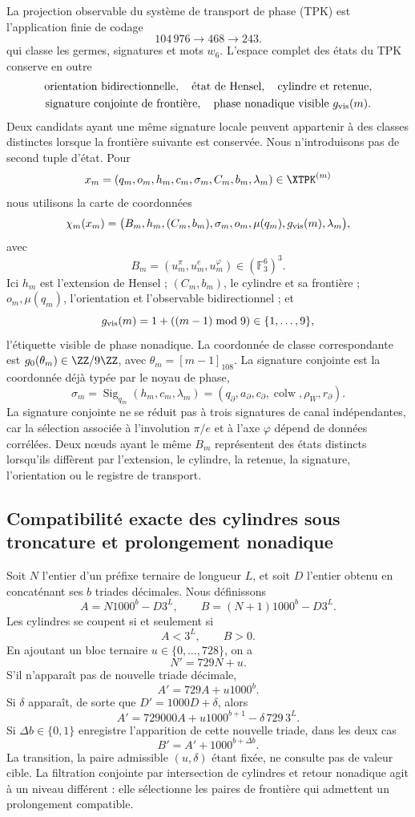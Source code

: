 La projection observable du système de transport de phase (TPK) est
l'application finie de codage
\[
104\,976\longrightarrow468\longrightarrow243.
\]
qui classe les germes, signatures et mots \(w_6\). L'espace complet des
états du TPK conserve en outre
\[
\begin{gathered}
\text{orientation bidirectionnelle},\quad
\text{état de Hensel},\quad
\text{cylindre et retenue},\\
\text{signature conjointe de frontière},\quad
\text{phase nonadique visible }g_{\rm vis}(m).
\end{gathered}
\]
Deux candidats ayant une même signature locale peuvent appartenir à des classes distinctes
lorsque la frontière suivante est conservée. Nous n'introduisons pas de second tuple
d'état. Pour
\[
x_m=(q_m,o_m,h_m,c_m,\sigma_m,C_m,b_m,\lambda_m)\in\XTPK^{(m)}
\]
nous utilisons la carte de coordonnées
\[
\chi_m(x_m)=
\bigl(
B_m,h_m,(C_m,b_m),\sigma_m,
o_m,\mu(q_m),g_{\rm vis}(m),\lambda_m
\bigr),
\]
avec
\[
B_m=(u_m^\pi,u_m^e,u_m^\varphi)\in(\mathbb F_3^6)^3.
\]
Ici \(h_m\) est l'extension de Hensel ; \((C_m,b_m)\), le cylindre et sa
frontière ; \(o_m,\mu(q_m)\), l'orientation et l'observable bidirectionnel ; et
\[
g_{\rm vis}(m)=1+((m-1)\bmod9)\in\{1,\ldots,9\},
\]
l'étiquette visible de phase nonadique. La coordonnée de classe correspondante
est \(g_0(\theta_m)\in\ZZ/9\ZZ\), avec \(\theta_m=[m-1]_{108}\). La signature conjointe
est la coordonnée déjà typée par le noyau de phase,
\[
\sigma_m=\operatorname{Sig}_{q_m}(h_m,c_m,\lambda_m)
=(q_\partial,a_\partial,c_\partial,
\operatorname{colw},\rho_W,r_\partial).
\]
La signature conjointe ne se réduit pas à trois signatures de canal indépendantes, car la
sélection associée à l'involution \(\pi/e\) et à l'axe \(\varphi\) dépend de
données corrélées. Deux nœuds ayant le même \(B_m\) représentent des états
distincts lorsqu'ils diffèrent par l'extension, le cylindre, la retenue, la signature, l'orientation
ou le registre de transport.

\subsection{Compatibilité exacte des cylindres sous troncature et prolongement nonadique}

Soit \(N\) l'entier d'un préfixe ternaire de longueur \(L\), et soit \(D\)
l'entier obtenu en concaténant ses \(b\) triades décimales. Nous définissons
\[
A=N1000^b-D3^L,
\qquad
B=(N+1)1000^b-D3^L.
\]
Les cylindres se coupent si et seulement si
\[
\boxed{A<3^L,\qquad B>0.}
\]
En ajoutant un bloc ternaire \(u\in\{0,\ldots,728\}\), on a
\[
N'=729N+u.
\]
S'il n'apparaît pas de nouvelle triade décimale,
\[
A'=729A+u1000^b.
\]
Si \(\delta\) apparaît, de sorte que \(D'=1000D+\delta\), alors
\[
A'=729000A+u1000^{b+1}-\delta\,729\,3^L.
\]
Si \(\Delta b\in\{0,1\}\) enregistre l'apparition de cette nouvelle triade, dans
les deux cas
\[
B'=A'+1000^{b+\Delta b}.
\]
La transition, la paire admissible \((u,\delta)\) étant fixée, ne consulte pas de valeur
cible. La filtration conjointe par intersection de cylindres et retour
nonadique agit à un niveau différent : elle sélectionne les paires de frontière qui
admettent un prolongement compatible.

